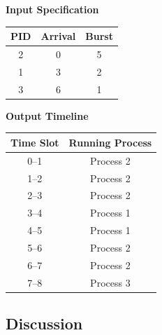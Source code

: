 \documentclass[11pt,a4paper]{article}
\begin{document}
\begin{center}
\begin{minipage}[t]{0.45\textwidth}
\centering
\textbf{Input Specification}
\vspace{0.3em}

\begin{tabular}{ccc}
\toprule
\textbf{PID} & \textbf{Arrival} & \textbf{Burst} \\
\midrule
2 & 0 & 5 \\
1 & 3 & 2 \\
3 & 6 & 1 \\
\bottomrule
\end{tabular}
\end{minipage}
\hfill
\begin{minipage}[t]{0.45\textwidth}
\centering
\textbf{Output Timeline}
\vspace{0.3em}

\begin{tabular}{cc}
\toprule
\textbf{Time Slot} & \textbf{Running Process} \\
\midrule
0--1  & Process 2 \\
1--2  & Process 2 \\
2--3  & Process 2 \\
3--4  & Process 1 \\
4--5  & Process 1 \\
5--6  & Process 2 \\
6--7  & Process 2 \\
7--8  & Process 3 \\
\bottomrule
\end{tabular}
\end{minipage}
\end{center}

\subsection{Discussion}
\end{document}
